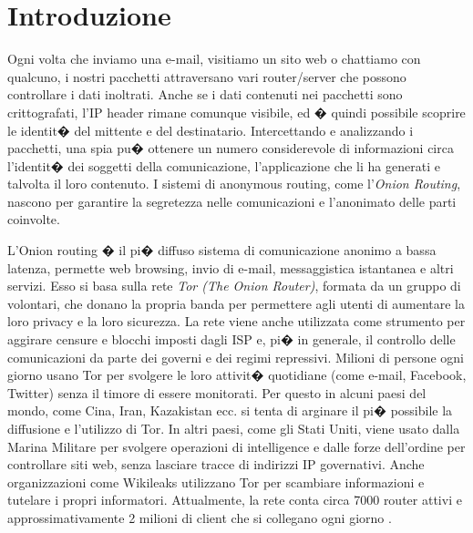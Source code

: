 \chapter*{Introduzione}
Ogni volta che inviamo una e-mail, visitiamo un sito web o chattiamo con qualcuno, i nostri pacchetti attraversano vari router/server che possono controllare i dati inoltrati. Anche se i dati contenuti nei pacchetti sono crittografati, l'IP header rimane comunque visibile, ed � quindi possibile scoprire le identit� del mittente e del destinatario. Intercettando e analizzando i pacchetti, una spia pu� ottenere un numero considerevole di informazioni circa l'identit� dei soggetti della comunicazione, l'applicazione che li ha generati e talvolta il loro contenuto.
I sistemi di anonymous routing, come l'\emph{Onion Routing}\cite{tor}, nascono per garantire la segretezza nelle comunicazioni e l'anonimato delle parti coinvolte.

L'Onion routing � il pi� diffuso sistema di comunicazione anonimo a bassa latenza, permette web browsing, invio di e-mail, messaggistica istantanea e altri servizi. Esso si basa sulla rete \emph{Tor (The Onion Router)}, formata da un gruppo di volontari, che donano la propria banda per permettere agli utenti di aumentare la loro privacy e la loro sicurezza. La rete viene anche utilizzata come strumento per aggirare censure e blocchi imposti dagli ISP e, pi� in generale, il controllo delle comunicazioni da parte dei governi e dei regimi repressivi. Milioni di persone ogni giorno usano Tor per svolgere le loro attivit� quotidiane (come e-mail, Facebook, Twitter) senza il timore di essere monitorati. Per questo in alcuni paesi del mondo, come Cina, Iran, Kazakistan ecc. si tenta di arginare il pi� possibile la diffusione e l'utilizzo di Tor. In altri paesi, come gli Stati Uniti, viene usato dalla Marina Militare per svolgere operazioni di intelligence e dalle forze dell'ordine per controllare siti web, senza lasciare tracce di indirizzi IP governativi. Anche organizzazioni come Wikileaks utilizzano Tor per scambiare informazioni e tutelare i propri informatori. Attualmente, la rete conta circa 7000 router attivi e approssimativamente 2 milioni di client che si collegano ogni giorno \cite{tormetrics}.








